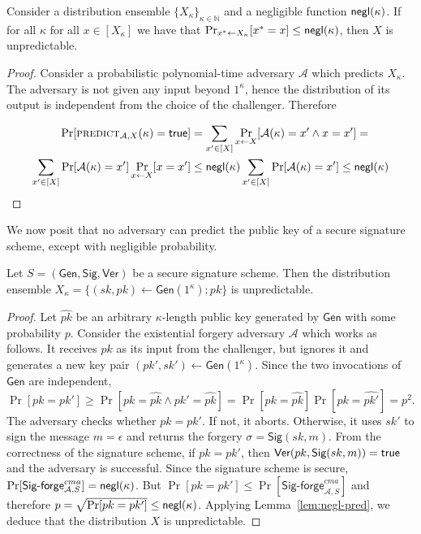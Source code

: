 \begin{lemma}\label{lem:negl-pred}
  Consider a distribution ensemble $\{X_{\kappa}\}_{\kappa\in\mathbb{N}}$ and
  a negligible function $\textsf{negl}(\kappa)$. If for all $\kappa$ for all
  $x \in [X_\kappa]$ we have that
  $\Pr_{x^* \gets X_\kappa}[x^* = x] \leq \textsf{negl}(\kappa)$, then
  $X$ is unpredictable.
\end{lemma}
\begin{proof}
  Consider a probabilistic polynomial-time adversary $\mathcal{A}$ which
  predicts $X_\kappa$. The adversary is not given any input beyond $1^\kappa$,
  hence the distribution of its output is independent from the choice of the
  challenger. Therefore

  \begin{align*}
  \Pr[\textsc{predict}_{\mathcal{A},X}(\kappa) = \mathsf{true}] &=
  \sum_{x' \in [X]}\Pr_{x \gets X}[\mathcal{A}(\kappa) = x'\land x = x'] =\\
  \sum_{x' \in [X]}\Pr[\mathcal{A}(\kappa) = x']\Pr_{x \gets X}[x = x']
  &\leq \textsf{negl}(\kappa)\sum_{x' \in [X]}\Pr[\mathcal{A}(\kappa) = x']
  \leq \textsf{negl}(\kappa)
  \end{align*}
\end{proof}

We now posit that no adversary can predict the public key of a secure signature scheme, except with negligible probability.

\begin{lemma}\label{lem:pk-unpredictability}
  Let $S = (\textsf{Gen}, \textsf{Sig}, \textsf{Ver})$ be a secure signature scheme.
  Then the distribution ensemble
  $X_\kappa = \{(sk, pk) \gets \textsf{Gen}(1^\kappa); pk\}$ is
  unpredictable.
\end{lemma}
\begin{proof}
  Let $\widehat{pk}$ be an arbitrary $\kappa$-length public key generated
  by $\textsf{Gen}$ with some probability $p$.
  Consider the existential forgery adversary $\mathcal{A}$ which works as
  follows. It receives $pk$ as its input from the challenger, but ignores it
  and generates a new key pair $(pk', sk') \gets \textsf{Gen}(1^\kappa)$.
  Since the
  two invocations of $\textsf{Gen}$ are independent,
  $\Pr[pk = pk'] \geq \Pr[pk = \widehat{pk} \land pk' = \widehat{pk}]
  = \Pr[pk = \widehat{pk}]\Pr[pk = \widehat{pk'}] = p^2$. The adversary checks
  whether $pk = pk'$. If not, it aborts. Otherwise, it uses $sk'$ to sign the
  message $m = \epsilon$ and returns the forgery $\sigma = \textsf{Sig}(sk, m)$.
  From the correctness of the signature scheme, if $pk = pk'$, then
  $\textsf{Ver}(pk, \textsf{Sig}(sk, m)) = \mathsf{true}$ and the adversary is
  successful. Since the signature scheme is secure,
  $\Pr[\textsf{Sig-forge}^{cma}_{\mathcal{A},S}] = \textsf{negl}(\kappa)$.
  But $\Pr[pk = pk'] \leq \Pr[\textsf{Sig-forge}^{cma}_{\mathcal{A},S}]$ and
  therefore $p = \sqrt{\Pr[pk = pk']} \leq \textsf{negl}(\kappa)$. Applying
  Lemma~\ref{lem:negl-pred}, we deduce that the distribution $X$ is
  unpredictable.
\end{proof}

